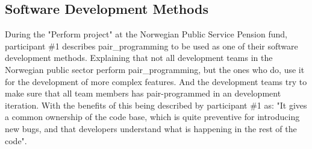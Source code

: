 

\subsection{Software Development Methods}
During the "Perform project" at the Norwegian Public Service Pension fund, participant \#1 describes \gls{pair_programming} to be used as one of their software development methods. Explaining that not all development teams in the Norwegian public sector perform \gls{pair_programming}, but the ones who do, use it for the development of more complex features. And the development teams try to make sure that all team members has pair-programmed in an development iteration. With the benefits of this being described by participant \#1 as: "It gives a common ownership of the code base, which is quite preventive for introducing new bugs, and that developers understand what is happening in the rest of the code".


